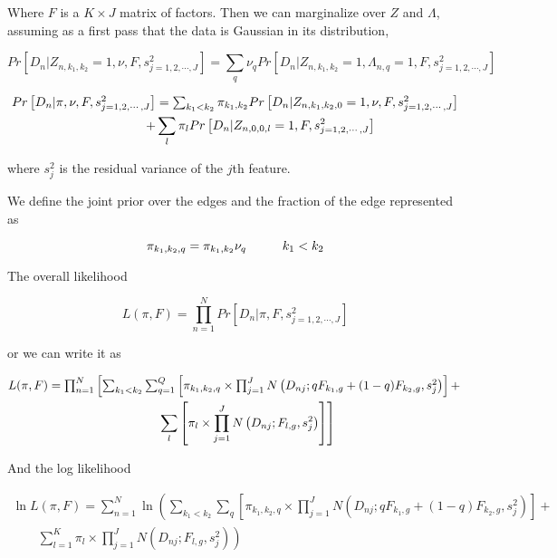 \documentclass[12pt]{article}
\begin{document}
Where $F$ is a $K\times J$ matrix of factors. 
Then we can marginalize over $Z$ and $\Lambda$, assuming as a first pass 
that the data is Gaussian in its distribution,

$$ Pr \left [ D_{n} | Z_{n, k_1, k_2}=1, \nu, F, s^2_{j=1,2,\cdots,J} \right ] = \sum_{q} \nu_{q} Pr \left [D_{n} | Z_{n, k_1, k_2}=1, \Lambda_{n, q}=1, F, s^2_{j=1,2,\cdots,J} \right ] $$

\begin{multline}
 $$ Pr \left [ D_{n} | \pi, \nu, F, s^2_{j=1,2,\cdots,J} \right ] = \sum_{k_1 < k_2}
 \pi_{k_1, k_2} Pr \left [ D_{n} | Z_{n, k_1, k_2, 0}=1, \nu, F, s^2_{j=1,2,\cdots,J} \right ]  \\
   \qquad \qquad +  \sum_{l} \pi_{l} Pr \left [ D_{n} | Z_{n, 0, 0, l}=1,  F, s^2_{j=1,2,\cdots,J} \right ]$$
 \end{multline}
 
 

where $s^2_{j}$ is the residual variance of the $j$th feature.
 
We define the joint prior over the edges and the fraction of the edge represented as 

$$ \pi_{k_1,k_2, q} = \pi_{k_1, k_2} \nu_{q} \hspace{1 cm} k_1 < k_2 $$

The overall likelihood 

$$ L(\pi, F) = \prod_{n=1}^{N} Pr \left [ D_{n} | \pi, F, s^2_{j=1,2,\cdots,J} \right ] $$

or we can write it as 

\begin{multline}
$$L(\pi, F) = \prod_{n=1}^{N} \left [ \sum_{k_1 < k_2} \sum_{q=1}^{Q} \left [ \pi_{k_1,k_2, q} \times \prod_{j=1}^{J} N \left (D_{nj}; q F_{k_1,g} + (1-q) F_{k_2, g}, s^2_{j} \right) \right ]   + \right. \\
\left.   \qquad \sum_{l} \left [ \pi_{l} \times \prod_{j=1}^{J} N \left (D_{nj}; F_{l,g} , s^2_{j} \right) \right ] \right]$$
\end{multline}

And the log likelihood

\begin{multline}
\ln {L (\pi, F)} = \sum_{n=1}^{N} \ln \left (\sum_{k_1 < k_2} \sum_{q} \left [ \pi_{k_1,k_2, q} \times \prod_{j=1}^{J} N \left (D_{nj}; q F_{k_1,g} + (1-q) F_{k_2, g}, s^2_{j} \right) \right ] + \right . \\
\left. \qquad \sum_{l=1}^{K} \pi_{l}  \times \prod_{j=1}^{J} N \left (D_{nj}; F_{l,g}, s^2_{j} \right)\right )
\end{multline}
\end{document}
